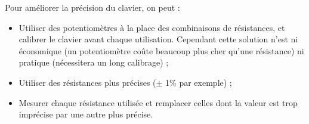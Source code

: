 Pour améliorer la précision du clavier, on peut :
\begin{itemize}
	\item Utiliser des potentiomètres à la place des combinaisons
	de résistances, et calibrer le clavier avant chaque utilisation.
	Cependant cette solution n'est ni économique (un potentiomètre
	coûte beaucoup plus cher qu'une résistance) ni pratique (nécessitera
	un long calibrage) ;
	\item Utiliser des résistances plus précises ($\pm$ 1\% par exemple) ;
	\item Mesurer chaque résistance utilisée et remplacer celles dont la
	valeur est trop imprécise par une autre plus précise.
\end{itemize}


